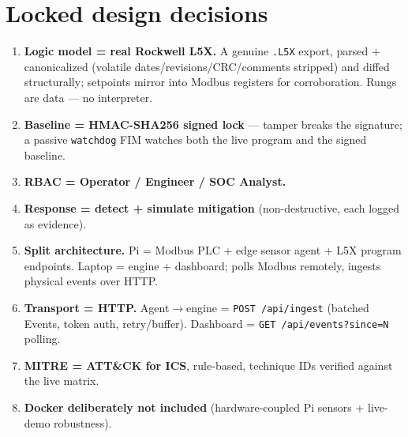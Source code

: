 \documentclass[11pt,a4paper]{article}
\newcommand{\code}[1]{\texttt{\small #1}}
\begin{document}
\section{Locked design decisions}
\begin{enumerate}[leftmargin=1.6em,itemsep=2pt]
  \item \textbf{Logic model = real Rockwell L5X.} A genuine \code{.L5X} export, parsed + canonicalized
        (volatile dates/revisions/CRC/comments stripped) and diffed structurally; setpoints mirror into
        Modbus registers for corroboration. Rungs are data --- no interpreter.
  \item \textbf{Baseline = HMAC-SHA256 signed lock} --- tamper breaks the signature; a passive
        \code{watchdog} FIM watches both the live program and the signed baseline.
  \item \textbf{RBAC = Operator / Engineer / SOC Analyst.}
  \item \textbf{Response = detect + simulate mitigation} (non-destructive, each logged as evidence).
  \item \textbf{Split architecture.} Pi = Modbus PLC + edge sensor agent + L5X program endpoints. Laptop =
        engine + dashboard; polls Modbus remotely, ingests physical events over HTTP.
  \item \textbf{Transport = HTTP.} Agent$\rightarrow$engine = \code{POST /api/ingest} (batched Events,
        token auth, retry/buffer). Dashboard = \code{GET /api/events?since=N} polling.
  \item \textbf{MITRE = ATT\&CK for ICS}, rule-based, technique IDs verified against the live matrix.
  \item \textbf{Docker deliberately not included} (hardware-coupled Pi sensors + live-demo robustness).
\end{enumerate}

\end{document}
